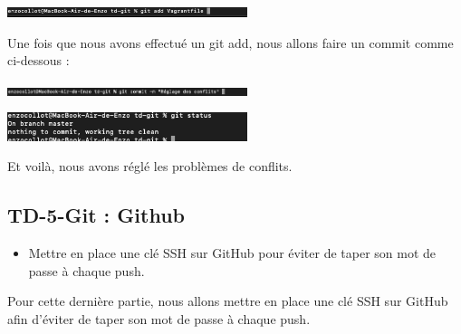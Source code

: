 \documentclass[12pt]{article}
\begin{document}
\vspace{0.3cm}

\begin{center}
  \includegraphics[width=7cm]{Images-TD-Git/Image-TD-Git-4/git add.png}
\end{center}

\vspace{0.3cm}

Une fois que nous avons effectué un git add, nous allons faire un commit comme ci-dessous :

\vspace{0.3cm}

\begin{center}
  \includegraphics[width=7cm]{Images-TD-Git/Image-TD-Git-4/git-commit-conflits.png}
\end{center}

\vspace{0.3cm}

\begin{center}
  \includegraphics[width=7cm]{Images-TD-Git/Image-TD-Git-4/git-status.png}
\end{center}

\vspace{0.3cm}

Et voilà, nous avons réglé les problèmes de conflits.

\newpage

\subsection{TD-5-Git : Github}

\vspace{0.3cm}

\begin{itemize}
  \item Mettre en place une clé SSH sur GitHub pour éviter de taper son mot de passe à chaque push.
\end{itemize}

\vspace{0.3cm}

Pour cette dernière partie, nous allons mettre en place une clé SSH sur GitHub afin d'éviter de taper son mot de passe à chaque push. \\
\end{document}
